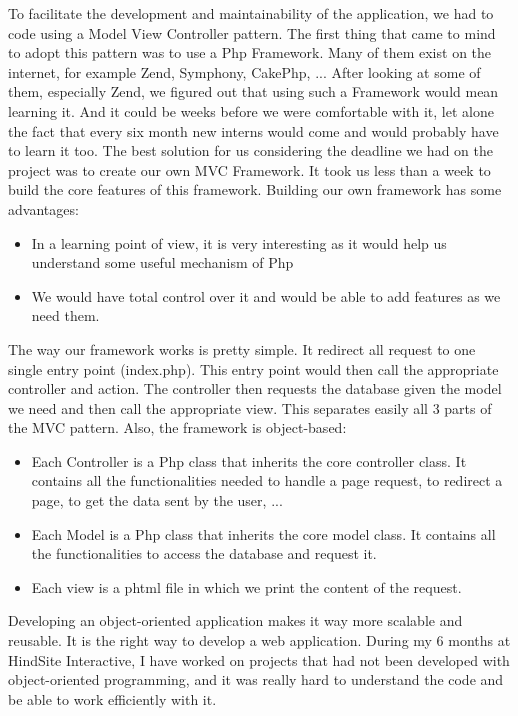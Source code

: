 To facilitate the development and maintainability of the application, we had to code using a Model View Controller pattern. The first thing that came to mind to adopt this pattern was to use a Php Framework. Many of them exist on the internet, for example Zend, Symphony, CakePhp, ... After looking at some of them, especially Zend, we figured out that using such a Framework would mean learning it. And it could be weeks before we were comfortable with it, let alone the fact that every six month new interns would come and would probably have to learn it too. The best solution for us considering the deadline we had on the project was to create our own MVC Framework. It took us less than a week to build the core features of this framework. Building our own framework has some advantages:
\begin{itemize}
\item In a learning point of view, it is very interesting as it would help us understand some useful mechanism of Php
\item We would have total control over it and would be able to add features as we need them.
\end{itemize}

The way our framework works is pretty simple. It redirect all request to one single entry point (index.php). This entry point would then call the appropriate controller and action. The controller then requests the database given the model we need and then call the appropriate view. This separates easily all 3 parts of the MVC pattern.
Also, the framework is object-based: 
\begin{itemize}
\item Each Controller is a Php class that inherits the core controller class. It contains all the functionalities needed to handle a page request, to redirect a page, to get the data sent by the user, ...
\item Each Model is a Php class that inherits the core model class. It contains all the functionalities to access the database and request it.
\item Each view is a phtml file in which we print the content of the request.
\end{itemize}
Developing an object-oriented application makes it way more scalable and reusable. It is the right way to develop a web application. During my 6 months at HindSite Interactive, I have worked on projects that had not been developed with object-oriented programming, and it was really hard to understand the code and be able to work efficiently with it. 

